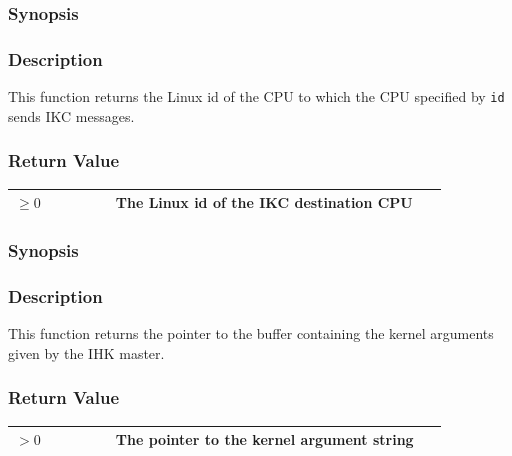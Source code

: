 \documentclass[twoside,11pt,fleqn]{book}
\begin{document}
\subsubsection{}
\subsubsection*{Synopsis}{\quad}

\subsubsection*{Description}{\quad}
This function returns the Linux id of the CPU to which the CPU specified by \texttt{id} sends IKC messages.

\subsubsection*{Return Value}{\quad}
\begin{table}[!h]
\footnotesize
\begin{tabular}{|p{0.20\linewidth}|p{0.66\linewidth}|} \hline
$\ge 0$&The Linux id of the IKC destination CPU\\ \hline
\end{tabular}
\vspace{-0em}
\end{table}
\FloatBarrier

\subsubsection{}
\subsubsection*{Synopsis}{\quad}

\subsubsection*{Description}{\quad}
This function returns the pointer to the buffer containing the kernel arguments given by the IHK master.

\subsubsection*{Return Value}{\quad}
\begin{table}[!h]
\footnotesize
\begin{tabular}{|p{0.20\linewidth}|p{0.66\linewidth}|} \hline
$> 0$&The pointer to the kernel argument string\\ \hline
\end{tabular}
\vspace{-0em}
\end{table}
\FloatBarrier
\end{document}
